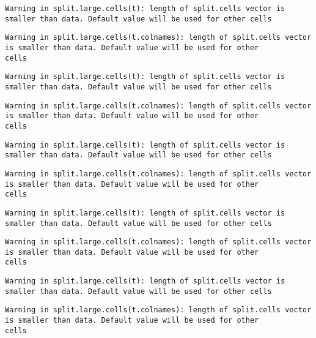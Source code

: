 \documentclass[
  10pt,
  a4paper,oneside]{article}
\begin{document}
\begin{verbatim}
Warning in split.large.cells(t): length of split.cells vector is smaller than data. Default value will be used for other cells
\end{verbatim}

\begin{verbatim}
Warning in split.large.cells(t.colnames): length of split.cells vector is smaller than data. Default value will be used for other
cells
\end{verbatim}

\begin{verbatim}
Warning in split.large.cells(t): length of split.cells vector is smaller than data. Default value will be used for other cells
\end{verbatim}

\begin{verbatim}
Warning in split.large.cells(t.colnames): length of split.cells vector is smaller than data. Default value will be used for other
cells
\end{verbatim}

\begin{verbatim}
Warning in split.large.cells(t): length of split.cells vector is smaller than data. Default value will be used for other cells
\end{verbatim}

\begin{verbatim}
Warning in split.large.cells(t.colnames): length of split.cells vector is smaller than data. Default value will be used for other
cells
\end{verbatim}

\begin{verbatim}
Warning in split.large.cells(t): length of split.cells vector is smaller than data. Default value will be used for other cells
\end{verbatim}

\begin{verbatim}
Warning in split.large.cells(t.colnames): length of split.cells vector is smaller than data. Default value will be used for other
cells
\end{verbatim}

\begin{verbatim}
Warning in split.large.cells(t): length of split.cells vector is smaller than data. Default value will be used for other cells
\end{verbatim}

\begin{verbatim}
Warning in split.large.cells(t.colnames): length of split.cells vector is smaller than data. Default value will be used for other
cells
\end{verbatim}
\end{document}
